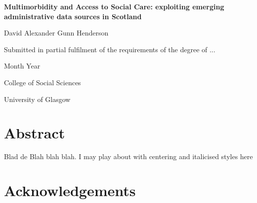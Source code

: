 \documentclass[12pt,]{report}
\title{}
\author{}
\date{}
\begin{document}

\begin{centering}

\vspace{3 cm}

\Huge

{\bf Multimorbidity and Access to Social Care: exploiting emerging administrative data sources in Scotland}

\vspace{3 cm}

\Large
David Alexander Gunn Henderson

\vspace{3 cm}


\normalsize
Submitted in partial fulfilment of the requirements of the degree of ...

Month Year

\vspace{3 cm}

\normalsize
College of Social Sciences

\normalsize
University of Glasgow

\end{centering}

\newpage

\pagestyle{fancy}

\fancyhead[LE,RO]{} \fancyhead[LO,RE]{}
\renewcommand{\headrulewidth}{0.4pt} \renewcommand{\footrulewidth}{0pt}


\section*{Abstract}

Blad de Blah blah blah. I may play about with centering and italicised
styles here

\newpage

 \setcounter{tocdepth}{2}
\tableofcontents

\newpage

 \listoftables

\newpage

 \listoffigures

\newpage

\section*{Acknowledgements}
\end{document}
